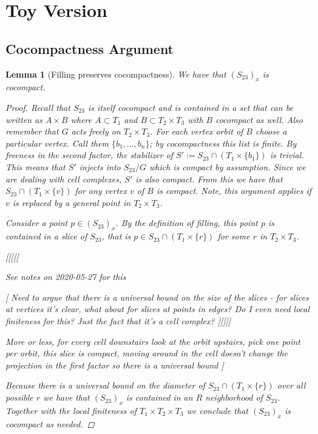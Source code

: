 \documentclass{article}
\theoremstyle{mystyle}
\newtheorem{lem}{Lemma}[section]
\theoremstyle{remark}
\begin{document}
\tableofcontents

\section{Toy Version}
\subsection{Cocompactness Argument}

\begin{lem} 
[Filling preserves cocompactness]
\label{lem:fillingcocompact}
We have that $(S_{23})_x$ is cocompact.
\begin{proof}
    Recall that $S_{23}$ is itself cocompact and is contained in a set that can be written as $A\times B$ where $A\subset T_1$ and $B\subset T_2\times T_3$ with $B$ cocompact as well. Also remember that $G$ acts freely on $T_2\times T_3$. For each vertex orbit of $B$ choose a particular vertex. Call them $\{b_1,\ldots,b_n\}$; by cocompactness this list is finite. By freeness in the second factor, the stabilizer of $S' := S_{23} \cap (T_1 \times \{b_1\})$ is trivial. This means that $S'$ injects into $S_{23}/G$ which is compact by assumption. Since we are dealing with cell complexes, $S'$ is also compact. From this we have that $S_{23}\cap (T_1\times \{v\})$ for any vertex $v$ of $B$ is compact. Note, this argument applies if $v$ is replaced by a general point in $T_2 \times T_3$.
    
    Consider a point $p \in (S_{23})_x$. By the definition of filling, this point $p$ is contained in a slice of $S_{23}$, that is $p \in S_{23}\cap (T_1 \times \{r\})$ for some $r$ in $T_2\times T_3$.
    
   [[[[[
   
   See notes on 2020-05-27 for this
   
   [ Need to argue that there is a universal bound on the size of the slices - for slices at vertices it's clear, what about for slices at points in edges? Do I even need local finiteness for this? Just the fact that it's a cell complex? ]]]]]
   
   More or less, for every cell downstairs look at the orbit upstairs, pick one point per orbit, this slice is compact, moving around in the cell doesn't change the projection in the first factor so there is a universal bound
   ]
    
        Because there is a universal bound on the diameter of $S_{23}\cap (T_1 \times \{r\})$ over all possible $r$ we have that $(S_{23})_x$ is contained in an $R$ neighborhood of $S_{23}$. Together with the local finiteness of $T_1 \times T_2 \times T_3$ we conclude that $(S_{23})_x$ is cocompact as needed. 
    
    
    
    
    
    
\end{proof}
\end{lem}
\end{document}
